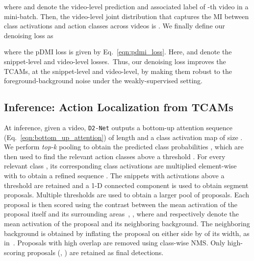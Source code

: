 \documentclass[10pt,twocolumn,letterpaper]{article}
\def\proposed{\texttt{D2-Net}{}}
\begin{document}
where  and  denote the video-level prediction and associated label of -th video in a mini-batch. Then, the video-level joint distribution that captures the MI between class activations and action classes across videos is  . We finally define our denoising loss as

where the pDMI loss is given by Eq.~\ref{eqn:pdmi_loss}. Here,  and  denote the snippet-level and video-level losses.~Thus, our denoising loss improves the TCAMs, at the snippet-level and video-level, by making them robust to the foreground-background noise under the weakly-supervised setting. 


\subsection{Inference: Action Localization from TCAMs}
At inference, given a video, \proposed{} outputs a bottom-up attention sequence  (Eq.~\ref{eqn:bottom_up_attention}) of length  and a class activation map  of size . We perform \textit{top-k} pooling to obtain the predicted class probabilities , which are then used to find the relevant action classes above a threshold . For every relevant class , its corresponding class activations  are multiplied element-wise with  to obtain a refined sequence . The snippets with activations above a threshold are retained and a 1-D connected component is used to obtain segment proposals. 
Multiple thresholds are used to obtain a larger pool of proposals. Each proposal is then scored using the contrast between the mean activation of the proposal itself and its surrounding areas~\cite{autoloc}, , where  and  respectively denote the mean activation of the proposal and its neighboring background. The neighboring background is obtained by inflating the proposal on either side by  of its width, as in~\cite{autoloc}.
Proposals with high overlap are removed using class-wise NMS. 
Only high-scoring proposals (\ie, ) are retained as final detections.
\end{document}
